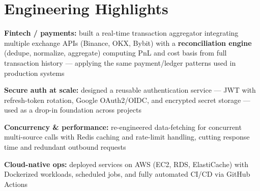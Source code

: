 \section{Engineering Highlights}
\begin{onecolentry}
    \begin{highlights}
        \item \textbf{Fintech / payments:} built a real-time transaction aggregator integrating multiple exchange APIs (Binance, OKX, Bybit) with a \textbf{reconciliation engine} (dedupe, normalize, aggregate) computing PnL and cost basis from full transaction history — applying the same payment/ledger patterns used in production systems
        \item \textbf{Secure auth at scale:} designed a reusable authentication service — JWT with refresh-token rotation, Google OAuth2/OIDC, and encrypted secret storage — used as a drop-in foundation across projects
        \item \textbf{Concurrency \& performance:} re-engineered data-fetching for concurrent multi-source calls with Redis caching and rate-limit handling, cutting response time and redundant outbound requests
        \item \textbf{Cloud-native ops:} deployed services on AWS (EC2, RDS, ElastiCache) with Dockerized workloads, scheduled jobs, and fully automated CI/CD via GitHub Actions
    \end{highlights}
\end{onecolentry}


